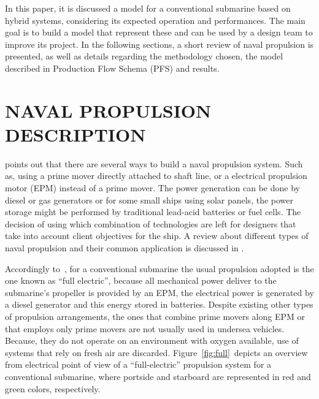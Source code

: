 \documentclass[10pt,fleqn,a4paper,twoside]{article}
\begin{document}
	In this paper, it is discussed a model for a conventional submarine based on hybrid systems, considering its expected operation and performances. The main goal is to build a model that represent these and can be used by a design team to improve its project. In the following sections, a short review of naval propulsion is presented, as well as details regarding the methodology chosen, the model described in Production Flow Schema (PFS) and results.
	
	\section{NAVAL PROPULSION DESCRIPTION}
	\label{sec:naval}
	\citet{Geertsma2017} points out that there are several ways to build a naval propulsion system. Such as, using a prime mover directly attached to shaft line, or a electrical propulsion motor (EPM) instead of a prime mover. The power generation can be done by diesel or gas generators or for some small ships using solar panels, the power storage might be performed by traditional lead-acid batteries or fuel cells. The decision of using which combination of technologies are left for designers that take into account client objectives for the ship. A review about different types of naval propulsion and their common application is discussed in \citet{Geertsma2017}.
	
	Accordingly to~\citet{Pereira2016}, for a conventional submarine the usual propulsion adopted is the one known as ``full electric'', because all mechanical power deliver to the submarine's propeller is provided by an EPM, the electrical power is generated by a diesel generator and this energy stored in batteries. Despite existing other types of propulsion arrangements, the ones that combine prime movers along EPM or that employs only prime movers are not usually used in undersea vehicles. Because, they do not operate on an environment with oxygen available, use of systems that rely on fresh air are discarded. Figure~\ref{fig:full}\ depicts an overview from electrical point of view of a ``full-electric'' propulsion system for a conventional submarine, where portside and starboard are represented in red and green colors, respectively.
	
\end{document}
